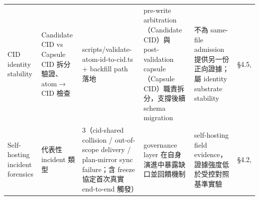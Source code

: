 \documentclass[a4paper,fontset=none]{ctexart}
\begin{document}
\begin{longtable}{L{0.15\textwidth}L{0.15\textwidth}L{0.15\textwidth}L{0.15\textwidth}L{0.15\textwidth}L{0.15\textwidth}}
CID identity stability & Candidate CID vs Capsule CID 拆分驗證、atom$\rightarrow$CID 檢查 & scripts/validate-atom-id-to-cid.ts + backfill path 落地 & pre-write arbitration（Candidate CID）與 post-validation capsule（Capsule CID）職責拆分，支撐後續 schema migration & 不為 same-file admission 提供另一份正向證據；屬 identity substrate stability & §4.5, \texttt{} \\
Self-hosting incident forensics & 代表性 incident 類型 & 3（cid-shared collision / out-of-scope delivery / plan-mirror sync failure；含 freeze 協定首次真實 end-to-end 觸發） & governance layer 在自身演進中暴露缺口並回饋機制 & self-hosting field evidence，證據強度低於受控對照基準實驗 & §4.2, \texttt{} \\
\bottomrule
\end{longtable}
\endgroup

\smallskip{}\par\smallskip
\end{document}
